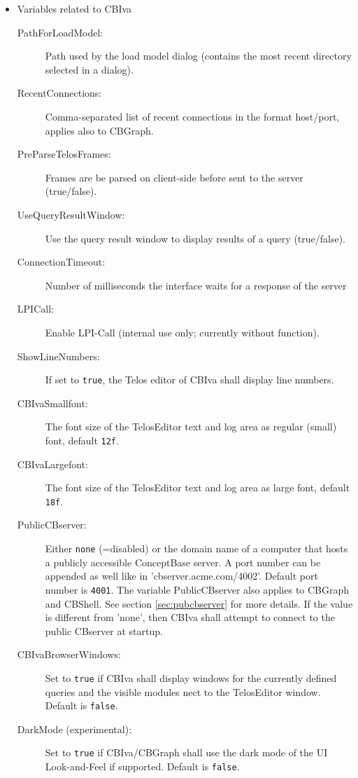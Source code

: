 \begin{itemize}
\item Variables related to CBIva
\begin{description}
\item[PathForLoadModel:] Path used by the load model dialog (contains the most recent directory selected in a dialog).
\item[RecentConnections:] Comma-separated list of recent connections in the format host/port, applies also to CBGraph.
\item[PreParseTelosFrames:] Frames are be parsed on client-side before sent to the server (true/false).
\item[UseQueryResultWindow:] Use the query result window to display results of a query (true/false).
\item[ConnectionTimeout:] Number of milliseconds the interface waits for a response of the server
\item[LPICall:] Enable LPI-Call (internal use only; currently without function).
\item[ShowLineNumbers:] If set to \verb+true+, the Telos editor of CBIva shall display line numbers.
\item[CBIvaSmallfont:] The font size of the TelosEditor text and log area as regular (small) font, default \verb+12f+.
\item[CBIvaLargefont:] The font size of the TelosEditor text and log area as large font, default \verb+18f+.
\item[PublicCBserver:] Either \verb+none+ (=disabled) or the domain name of a computer that hosts a publicly accessible
ConceptBase server. A port number can be appended as well like in 'cbserver.acme.com/4002'. Default port number is \verb+4001+.
The variable PublicCBserver also applies to CBGraph and CBShell. See section \ref{sec:pubcbserver} for more details. If the value is different
from 'none', then CBIva shall attempt to connect to the public CBserver at startup.
\item[CBIvaBrowserWindows:] Set to \verb+true+ if CBIva shall display windows for the currently defined queries
and the visible modules nect to the TelosEditor window. Default is \verb+false+.
\item[DarkMode (experimental):] Set to \verb+true+ if CBIva/CBGraph shall use the dark mode of the UI Look-and-Feel if supported.
Default is \verb+false+.
\end{description}



\end{itemize}
